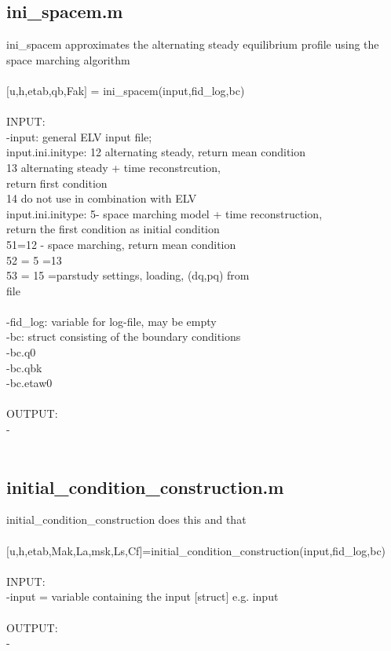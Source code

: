 \subsection{ini\_spacem.m}
ini\_spacem approximates the alternating steady equilibrium profile using the space marching algorithm \\ 
 \\ 
$[$u,h,etab,qb,Fak$]$ = ini\_spacem(input,fid\_log,bc) \\ 
 \\ 
INPUT: \\ 
   -input: general ELV input file; \\ 
       input.ini.initype:  12 alternating steady, return mean condition \\ 
                           13 alternating steady + time reconstrcution, \\ 
                           return first condition \\ 
                           14 do not use in combination with ELV \\ 
       input.ini.initype:  5- space marching model + time reconstruction, \\ 
                           return the first condition as initial condition \\ 
                           51=12 - space marching, return mean condition \\ 
                           52 = 5 =13 \\ 
                           53 = 15 =parstudy settings, loading, (dq,pq) from \\ 
                           file \\ 
                            \\ 
   -fid\_log: variable for log-file, may be empty \\ 
   -bc: struct consisting of the boundary conditions \\ 
           -bc.q0 \\ 
           -bc.qbk \\ 
           -bc.etaw0 \\ 
 \\ 
OUTPUT: \\ 
   - \\ 
 \\ 
\subsection{initial\_condition\_construction.m}
initial\_condition\_construction does this and that \\ 
 \\ 
$[$u,h,etab,Mak,La,msk,Ls,Cf$]$=initial\_condition\_construction(input,fid\_log,bc) \\ 
 \\ 
INPUT: \\ 
   -input = variable containing the input $[$struct$]$ e.g. input \\ 
 \\ 
OUTPUT: \\ 
   - \\ 
 \\ 
